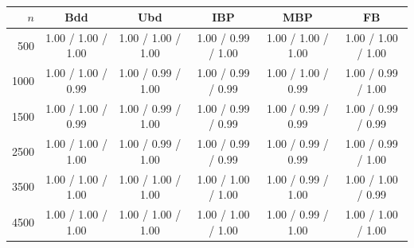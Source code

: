 \begin{table}[ht!]
    \centering
    \small
    \begin{tabular}{r c c c c c}
    \hline
    $n$ & Bdd & Ubd & IBP & MBP & FB \\
    \hline
    500 & 1.00 / 1.00 / 1.00 & 1.00 / 1.00 / 1.00 & 1.00 / 0.99 / 1.00 & 1.00 / 1.00 / 1.00 & 1.00 / 1.00 / 1.00 \\
    1000 & 1.00 / 1.00 / 0.99 & 1.00 / 0.99 / 1.00 & 1.00 / 0.99 / 0.99 & 1.00 / 1.00 / 0.99 & 1.00 / 0.99 / 1.00 \\
    1500 & 1.00 / 1.00 / 0.99 & 1.00 / 0.99 / 1.00 & 1.00 / 0.99 / 0.99 & 1.00 / 0.99 / 0.99 & 1.00 / 0.99 / 0.99 \\
    2500 & 1.00 / 1.00 / 1.00 & 1.00 / 0.99 / 1.00 & 1.00 / 0.99 / 0.99 & 1.00 / 0.99 / 0.99 & 1.00 / 0.99 / 1.00 \\
    3500 & 1.00 / 1.00 / 1.00 & 1.00 / 1.00 / 1.00 & 1.00 / 1.00 / 1.00 & 1.00 / 0.99 / 1.00 & 1.00 / 1.00 / 0.99 \\
    4500 & 1.00 / 1.00 / 1.00 & 1.00 / 1.00 / 1.00 & 1.00 / 1.00 / 1.00 & 1.00 / 0.99 / 1.00 & 1.00 / 1.00 / 1.00 \\
    \hline
    \end{tabular}
    \caption{}
    \label{tab:Exp1_features_Mfix_geom}
\end{table}
